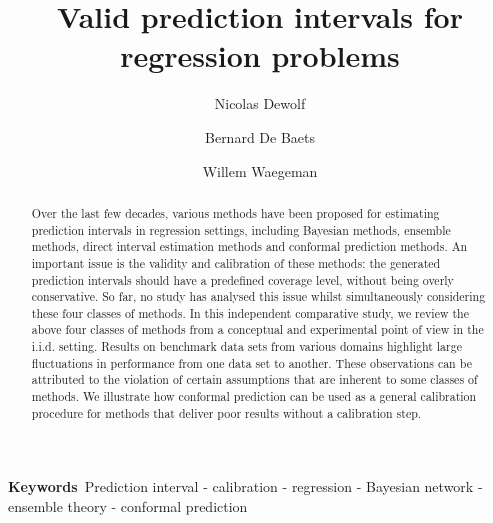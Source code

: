 \documentclass[smallcondensed]{svjour3}
\begin{document}
\title{Valid prediction intervals for regression problems}

\author{Nicolas Dewolf \and Bernard De Baets \and Willem Waegeman}

\date{}

\maketitle

\begin{abstract}
    Over the last few decades, various methods have been proposed for estimating prediction intervals in regression settings, including Bayesian methods, ensemble methods, direct interval estimation methods and conformal prediction methods. An important issue is the validity and calibration of these methods: the generated prediction intervals should have a predefined coverage level, without being overly conservative. So far, no
    study has analysed this issue whilst simultaneously considering these four classes of methods. In this independent comparative study, we review the above four classes of methods from a conceptual and experimental point of view in the i.i.d. setting. Results on benchmark data sets from various domains highlight large fluctuations in performance from one data set to another. These observations can be attributed to the violation of certain assumptions that are inherent to some classes of methods. We illustrate how conformal prediction can be used as a general calibration procedure for methods that deliver poor results without a calibration step.
\end{abstract}

\textbf{Keywords} \,Prediction interval - calibration - regression - Bayesian network - ensemble theory - conformal prediction
\end{document}
